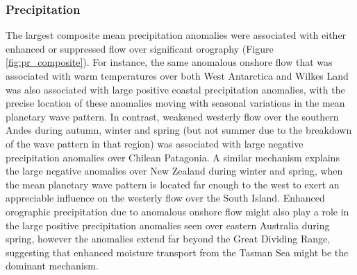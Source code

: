 \subsubsection{Precipitation}

The largest composite mean precipitation anomalies were associated with either enhanced or suppressed flow over significant orography (Figure \ref{fig:pr_composite}). For instance, the same anomalous onshore flow that was associated with warm temperatures over both West Antarctica and Wilkes Land was also associated with large positive coastal precipitation anomalies, with the precise location of these anomalies moving with seasonal variations in the mean planetary wave pattern. In contrast, weakened westerly flow over the southern Andes during autumn, winter and spring (but not summer due to the breakdown of the wave pattern in that region) was associated with large negative precipitation anomalies over Chilean Patagonia. A similar mechanism explains the large negative anomalies over New Zealand during winter and spring, when the mean planetary wave pattern is located far enough to the west to exert an appreciable influence on the westerly flow over the South Island. Enhanced orographic precipitation due to anomalous onshore flow might also play a role in the large positive precipitation anomalies seen over eastern Australia during spring, however the anomalies extend far beyond the Great Dividing Range, suggesting that enhanced moisture transport from the Tasman Sea might be the dominant mechanism. 
